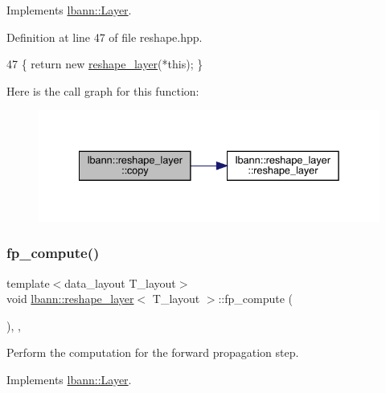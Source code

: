 Implements \hyperlink{classlbann_1_1Layer_af420f22bbac801c85483ade84588a23f}{lbann\+::\+Layer}.



Definition at line 47 of file reshape.\+hpp.


\begin{DoxyCode}
47 \{ \textcolor{keywordflow}{return} \textcolor{keyword}{new} \hyperlink{classlbann_1_1reshape__layer_a6161e3231e7a120bdfc0739eac08d196}{reshape\_layer}(*\textcolor{keyword}{this}); \}
\end{DoxyCode}
Here is the call graph for this function\+:\nopagebreak
\begin{figure}[H]
\begin{center}
\leavevmode
\includegraphics[width=335pt]{classlbann_1_1reshape__layer_a41685576d72830e400c31536d1d5bab2_cgraph}
\end{center}
\end{figure}
\mbox{\label{classlbann_1_1reshape__layer_a6a8567b61a1f911f52419ecd2346fcac}} 
\subsubsection{\texorpdfstring{fp\+\_\+compute()}{fp\_compute()}}
{\footnotesize\ttfamily template$<$data\+\_\+layout T\+\_\+layout$>$ \\
void \hyperlink{classlbann_1_1reshape__layer}{lbann\+::reshape\+\_\+layer}$<$ T\+\_\+layout $>$\+::fp\+\_\+compute (\begin{DoxyParamCaption}{ }\end{DoxyParamCaption})\hspace{0.3cm}{\ttfamily [inline]}, {\ttfamily [override]}, {\ttfamily [virtual]}}

Perform the computation for the forward propagation step. 

Implements \hyperlink{classlbann_1_1Layer_a523319dd1bd87a0612afa1912bb5aad7}{lbann\+::\+Layer}.



